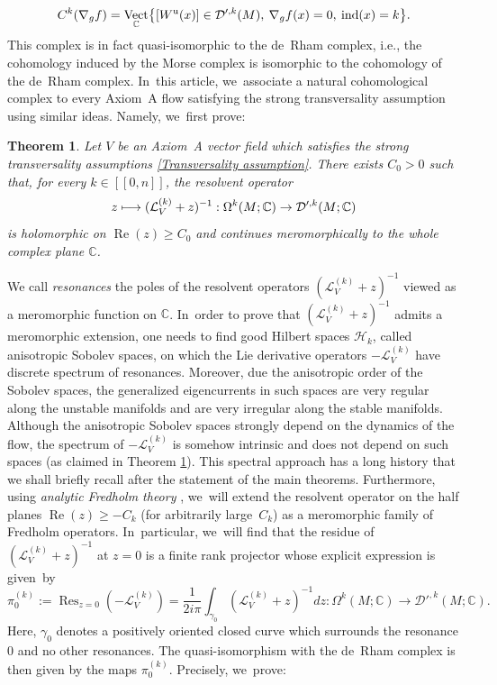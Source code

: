 \documentclass[11pt]{article}
\newcommand{\ie}{i.e.,\xspace}
\newcommand\mto{\mathchoice{\longmapsto}{\mapsto}{\mapsto}{\mapsto}}
\newcommand{\lcr}{[\![}
\newcommand{\rcr}{]\!]}
\DeclareMathOperator{\Reel}{Re}
\newcommand{\ru}{\mathrm{u}}
\theoremstyle{definition}
\theoremstyle{plain}
\newtheorem{thm}{Theorem}
\newcommand{\C}{\mathbb{C}}
\newcommand{\D}{\mathcal{D}}
\newcommand{\Hil}{\mathcal{H}}
\newcommand{\Lie}{\mathcal{L}}
\DeclareMathOperator{\ind}{ind}
\DeclareMathOperator{\Res}{Res}
\DeclareMathOperator{\Vect}{Vect}
\begin{document}
\begin{equation}{\label{eq: intro Morse complex current Laudenbach}}
C^k (\nabla_g f) = \Vect_{\C} \bigl\{ [W^\ru (x)] \in \D'^{,k} (M), \: \nabla_g f(x) = 0,\: \ind (x) = k \bigr\}.
\end{equation}
This complex is in fact quasi-isomorphic to the de~Rham complex, \ie the cohomology induced by the Morse complex is isomorphic to the cohomology of the de~Rham complex. In~this article, we~associate a natural cohomological complex to every Axiom~A flow satisfying the strong transversality assumption using similar ideas. Namely, we~first prove:

\begin{thm}\label{thm 2 intro}
Let $V$ be an Axiom~A vector field which satisfies the strong transversality assumptions \eqref{Transversality assumption}. There exists $C_0 > 0$ such that, for every $k\in\lcr0,n\rcr$, the resolvent operator
\[
z \mto(\Lie_V^{(k)} + z)^{-1}: \Omega^k (M;\C) \to \D'^{, k}(M;\C)
\]
is holomorphic on $\Reel (z)\geq C_0$ and continues meromorphically to the whole complex plane $\C$.
\end{thm}

We call \textit{resonances} the poles of the resolvent operators $(\Lie_V^{(k)} + z)^{-1}$ viewed as a meromorphic function on $\C$. In~order to prove that $(\Lie_V^{(k)} + z)^{-1}$ admits a meromorphic extension, one needs to find good Hilbert spaces $\Hil_k$, called anisotropic Sobolev spaces, on which the Lie derivative operators $-\Lie_V^{(k)}$ have discrete spectrum of resonances. Moreover, due the anisotropic order of the Sobolev spaces, the generalized eigencurrents in such spaces are very regular along the unstable manifolds and are very irregular along the stable manifolds. Although the anisotropic Sobolev spaces strongly depend on the dynamics of the flow, the spectrum of $-\Lie_V^{(k)}$ is somehow intrinsic and does not depend on such spaces (as claimed in Theorem \ref{thm 2 intro}). This spectral approach has a long history that we shall briefly recall after the statement of the main theorems. Furthermore, using \textit{analytic Fredholm theory} \cite[App.\,C]{DZ-book}, we~will extend the resolvent operator on the half planes $\Reel (z)\geq -C_k$ (for arbitrarily large~$C_k$) as a meromorphic family of Fredholm operators. In~particular, we~will find that the residue of $(\Lie_V^{(k)} + z)^{-1}$ at $z = 0$ is a finite rank projector whose explicit expression is given~by
\[
\pi_0^{(k)}:= \Res_{z = 0} (- \Lie_V^{(k)}) = \frac{1}{2 i \pi} \int_{\gamma_0} (\Lie_V^{(k)} + z)^{-1} dz: \Omega^k (M;\C) \to \D'^{,k}(M;\C).
\]
Here, $\gamma_0$ denotes a positively oriented closed curve which surrounds the resonance $0$ and no other resonances. The quasi-isomorphism with the de~Rham complex is then given by the maps $\pi_0^{(k)}$. Precisely, we~prove:
\end{document}

